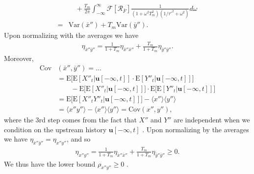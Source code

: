 \documentclass[%
 reprint,prx,
superscriptaddress,
%
%
%
%
%
%
%
%
%
 amsmath,amssymb,
 aps,
%
%
%
%
%
%
]{revtex4-2}
\begin{document}
{\begin{align*}
    & \quad +  \frac{T_{m}}{2\pi}\int_{-\infty}^{\infty}\mathcal{F}[\mathcal{R}_{\bar{F}}]\frac{1}{(1+\omega^{2}T_{m}^{2})(1/\tau'^{2} + \omega^{2})}d\omega\\
    =& \text{Var}(\bar{x}'') + T_{m}\text{Var}(\bar{y}'')  .
\end{align*}
Upon normalizing with the averages we have 
\begin{align*}
 \eta_{\bar{x}''\bar{y}''} = \frac{1}{1+T_{m}}\eta_{\bar{x}''\bar{x}''} + \frac{T_{m}}{1+T_{m}}\eta_{\bar{y}''\bar{y}''}  .
\end{align*}
Moreover, 
\begin{align*}
\text{Cov} &(\bar{x}'', \bar{y}'') = \dots\\
 &= \mathrm{E}\big[ \mathrm{E}[X''_{t}|\mathbf{u}[-\infty,t]]\cdot \mathrm{E}[Y''_{t}|\mathbf{u}[-\infty,t]] \big ] \\
 & \qquad - \mathrm{E}\big[ \mathrm{E}[X''_{t}|\mathbf{u}[-\infty,t]] \big ]\cdot\mathrm{E}\big[ \mathrm{E}[Y''_{t}|\mathbf{u}[-\infty,t]] \big ] \\
 &= \mathrm{E}\big[ \mathrm{E}[X''_{t}Y''_{t}|\mathbf{u}[-\infty,t]] \big ]
 - \langle x'' \rangle \langle y'' \rangle \\
 &= \langle x''y'' \rangle - \langle x'' \rangle \langle y'' \rangle = \text{Cov}(x'',y'') ,
\end{align*}
where the 3rd step comes from the fact that $X''$ and $Y''$ are independent when we condition on the upstream history $\mathbf{u}[-\infty,t]$ \cite{Hilfinger2012}. 
Upon normalizing by the averages we have $\eta_{\bar{x}''\bar{y}''} = \eta_{x''y''}$, and so 
\begin{align}
 \eta_{x''y''} = \frac{1}{1+T_{m}}\eta_{\bar{x}''\bar{x}''} + \frac{T_{m}}{1+T_{m}}\eta_{\bar{y}''\bar{y}''}  \geq 0  .
\label{EQ: no-feedback 3-step etaxy covariance equation}
\end{align}
We thus have the lower bound $\rho_{x''y''} \geq 0$ . \\


}
\end{document}
